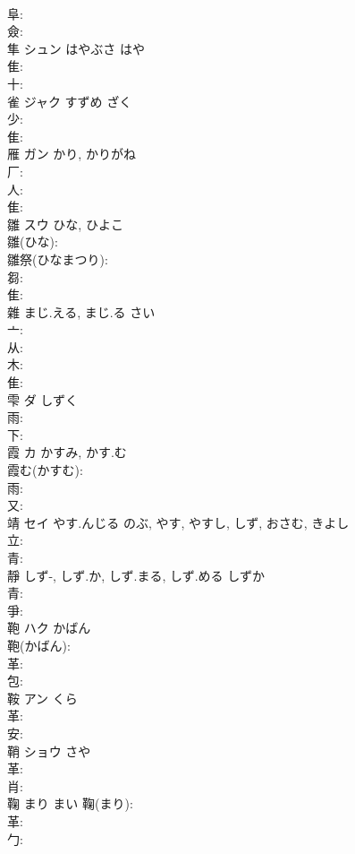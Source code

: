 \documentclass[8pt]{extreport}
\begin{document}
\begin{CJK}{UTF8}{min}
\\	阜: 
\\	僉: 
\\	隼	シュン	はやぶさ	はや	
\\	隹: 
\\	十: 
\\	雀	ジャク	すずめ	ざく	
\\	少: 
\\	隹: 
\\	雁	ガン	かり, かりがね		
\\	厂: 
\\	人: 
\\	隹: 
\\	雛	スウ	ひな, ひよこ		
\\	雛(ひな): 
\\	雛祭(ひなまつり): 
\\	芻: 
\\	隹: 
\\	雜		まじ.える, まじ.る	さい			
\\	亠: 
\\	从: 
\\	木: 
\\	隹: 
\\	雫	ダ	しずく		
\\	雨: 
\\	下: 
\\	霞	カ	かすみ, かす.む		
\\	霞む(かすむ): 
\\	雨: 
\\	又: 
\\	靖	セイ	やす.んじる	のぶ, やす, やすし, しず, おさむ, きよし	
\\	立: 
\\	青: 
\\	靜		しず-, しず.か, しず.まる, しず.める	しずか			
\\	青: 
\\	爭: 
\\	鞄	ハク	かばん		
\\	鞄(かばん): 
\\	革: 
\\	包: 
\\	鞍	アン	くら		
\\	革: 
\\	安: 
\\	鞘	ショウ	さや		
\\	革: 
\\	肖: 
\\	鞠		まり	まい		鞠(まり): 
\\	革: 
\\	勹: 

\end{CJK}
\end{document}
